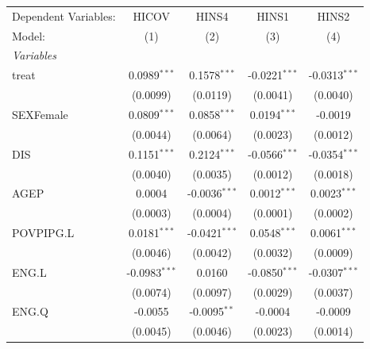 
\begingroup
\centering
\begin{tabular}{lcccc}
   \tabularnewline \midrule \midrule
   Dependent Variables:                      & HICOV           & HINS4           & HINS1           & HINS2\\  
   Model:                                    & (1)             & (2)             & (3)             & (4)\\  
   \midrule
   \emph{Variables}\\
   treat                                     & 0.0989$^{***}$  & 0.1578$^{***}$  & -0.0221$^{***}$ & -0.0313$^{***}$\\   
                                             & (0.0099)        & (0.0119)        & (0.0041)        & (0.0040)\\   
   SEXFemale                                 & 0.0809$^{***}$  & 0.0858$^{***}$  & 0.0194$^{***}$  & -0.0019\\   
                                             & (0.0044)        & (0.0064)        & (0.0023)        & (0.0012)\\   
   DIS                                       & 0.1151$^{***}$  & 0.2124$^{***}$  & -0.0566$^{***}$ & -0.0354$^{***}$\\   
                                             & (0.0040)        & (0.0035)        & (0.0012)        & (0.0018)\\   
   AGEP                                      & 0.0004          & -0.0036$^{***}$ & 0.0012$^{***}$  & 0.0023$^{***}$\\   
                                             & (0.0003)        & (0.0004)        & (0.0001)        & (0.0002)\\   
   POVPIPG.L                                 & 0.0181$^{***}$  & -0.0421$^{***}$ & 0.0548$^{***}$  & 0.0061$^{***}$\\   
                                             & (0.0046)        & (0.0042)        & (0.0032)        & (0.0009)\\   
   ENG.L                                     & -0.0983$^{***}$ & 0.0160          & -0.0850$^{***}$ & -0.0307$^{***}$\\   
                                             & (0.0074)        & (0.0097)        & (0.0029)        & (0.0037)\\   
   ENG.Q                                     & -0.0055         & -0.0095$^{**}$  & -0.0004         & -0.0009\\   
                                             & (0.0045)        & (0.0046)        & (0.0023)        & (0.0014)\\   

\end{tabular}
